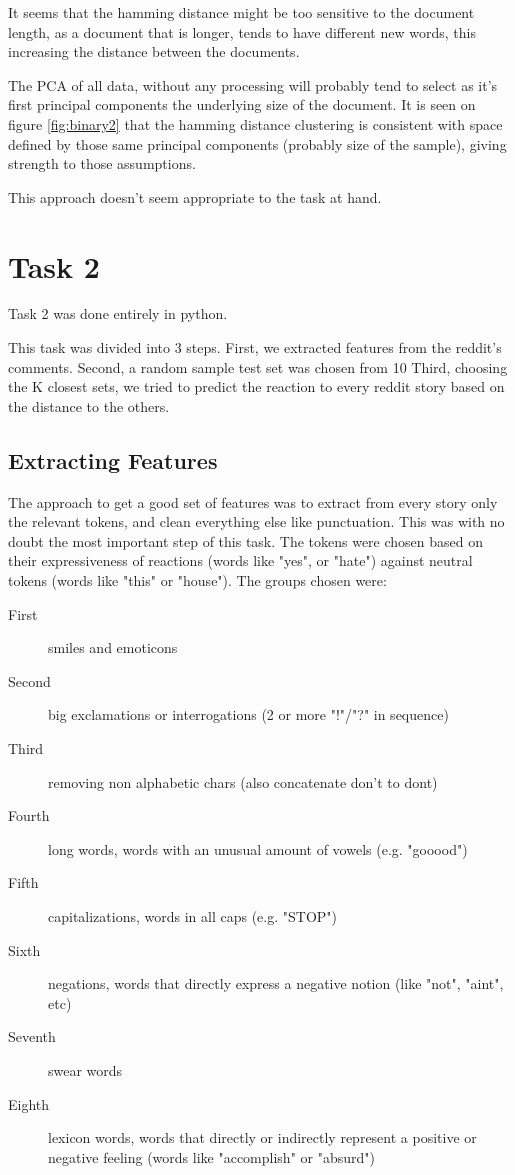 \documentclass[a4paper,10pt]{article}
\begin{document}
It seems that the hamming distance might be too sensitive to the document length, as a document that is longer, tends to have different new words, this increasing the distance between the documents.

The PCA of all data, without any processing will probably tend to select as it's first principal components the underlying size of the document. It is seen on figure \ref{fig:binary2} that the hamming distance clustering is consistent with space defined by those same principal components (probably size of the sample), giving strength to those assumptions.

This approach doesn't seem appropriate to the task at hand.

\section{Task 2}
Task 2 was done entirely in python.

This task was divided into 3 steps.
First, we extracted features from the reddit's comments.
Second, a random sample test set was chosen from 10%
Third, choosing the K closest sets, we tried to predict the reaction to every reddit story based on the distance to the others.

\subsection{Extracting Features}
The approach to get a good set of features was to extract from every story only the relevant tokens, and clean everything else like punctuation. This was with no doubt the most important step of this task.
The tokens were chosen based on their expressiveness of reactions (words like "yes", or "hate") against neutral tokens (words like "this" or "house"). The groups chosen were:
\begin{description}
\item[First] smiles and emoticons
\item[Second] big exclamations or interrogations (2 or more "!"/"?" in sequence)
\item[Third] removing non alphabetic chars (also concatenate don't to dont)
\item[Fourth] long words, words with an unusual amount of vowels (e.g. "gooood")
\item[Fifth] capitalizations, words in all caps (e.g. "STOP")
\item[Sixth] negations, words that directly express a negative notion (like "not", "aint", etc)
\item[Seventh] swear words
\item[Eighth] lexicon words, words that directly or indirectly represent a positive or negative feeling (words like "accomplish" or "absurd")
\end{description}
\end{document}
